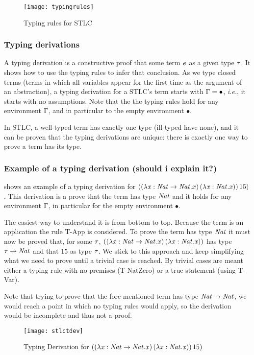 \begin{figure}
  \centering
  \texttt{[image: typingrules]}
  \caption{Typing rules for STLC}
  \label{STLC typing}
\end{figure}
\subsubsection{Typing derivations}
A typing derivation is a constructive proof that some term $\mathit{e}$ as a given type $\mathit{\tau}$. It shows how to use the typing rules to infer that conclusion. As we type closed terms (terms in which all variables appear for the first time as the argument of an abstraction), a typing derivation for a STLC's term starts with $\Gamma=\bullet$, \textit{i.e.}, it starts with no assumptions. Note that the the typing rules hold for any environment $\Gamma$, and in particular to the empty environment $\bullet$.

In STLC, a well-typed term has exactly one type (ill-typed have none), and it can be proven that the typing derivations are unique: there is exactly one way to prove a term has its type.

\subsubsection{Example of a typing derivation (should i explain it?)}
 shows an example of a typing derivation for $((\lambda \mathit{x}: \mathit{Nat} \rightarrow \mathit{Nat}.x) \, (\lambda \mathit{x}:\mathit{Nat}.\mathit{x}))\,15)$. This derivation is a prove that the term has type $\mathit{Nat}$ and it holds for any environment $\Gamma$, in particular for the empty environment $\bullet$.

The easiest way to understand it is from bottom to top. Because the term is an application the rule T-App is considered. To prove the term has type $\mathit{Nat}$ it must now be proved that, for some $\mathit{\tau}$, $((\lambda \mathit{x}: \mathit{Nat} \rightarrow \mathit{Nat}.x) \, (\lambda \mathit{x}:\mathit{Nat}.\mathit{x}))$ has type $\mathit{\tau} \rightarrow \mathit{Nat}$ and that $15$ as type $\mathit{\tau}$. We stick to this approach and keep simplifying what we need to prove until a trivial case is reached. By trivial cases are meant either a typing rule with no premises (T-NatZero) or a true statement (using T-Var).

Note that trying to prove that the fore mentioned term has type $\mathit{Nat} \rightarrow \mathit{Nat}$, we would reach a point in which no typing rules would apply, so the derivation would be incomplete and thus not a proof.

\begin{figure}
  \centering
  \texttt{[image: stlctdev]}
  \caption[angle=90]{Typing Derivation for  $((\lambda \mathit{x}: \mathit{Nat} \rightarrow \mathit{Nat}.x) \, (\lambda \mathit{x}:\mathit{Nat}.\mathit{x}))\,15)$}
  \label{stlctydev}
\end{figure}

